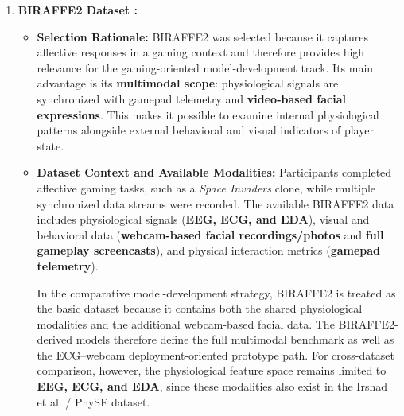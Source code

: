 \begin{enumerate}
    \item \textbf{BIRAFFE2 Dataset \autocite{kutt2022biraffe2}:}
    \begin{itemize}
        \item \textbf{Selection Rationale:} BIRAFFE2 was selected because it captures affective responses in a gaming context and therefore provides high relevance for the gaming-oriented model-development track. Its main advantage is its \textbf{multimodal scope}: physiological signals are synchronized with gamepad telemetry and \textbf{video-based facial expressions}. This makes it possible to examine internal physiological patterns alongside external behavioral and visual indicators of player state.

        \item \textbf{Dataset Context and Available Modalities:} Participants completed affective gaming tasks, such as a \textit{Space Invaders} clone, while multiple synchronized data streams were recorded. The available BIRAFFE2 data includes physiological signals (\textbf{EEG, ECG, and EDA}), visual and behavioral data (\textbf{webcam-based facial recordings/photos} and \textbf{full gameplay screencasts}), and physical interaction metrics (\textbf{gamepad telemetry}).

        In the comparative model-development strategy, BIRAFFE2 is treated as the basic dataset because it contains both the shared physiological modalities and the additional webcam-based facial data. The BIRAFFE2-derived models therefore define the full multimodal benchmark as well as the ECG--webcam deployment-oriented prototype path. For cross-dataset comparison, however, the physiological feature space remains limited to \textbf{EEG, ECG, and EDA}, since these modalities also exist in the Irshad et al. / PhySF dataset.


\end{itemize}
\end{enumerate}
